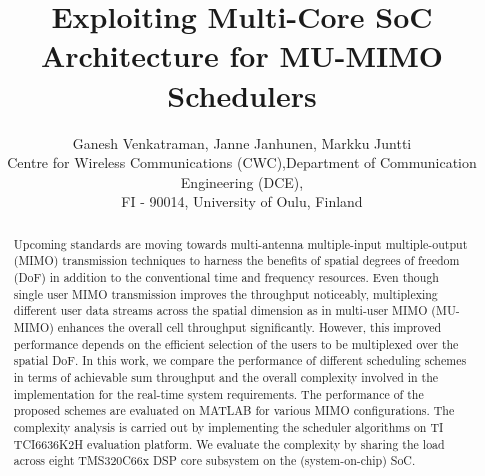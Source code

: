 \documentclass[conference,letterpaper]{./../../IEEE/IEEEtran}
\begin{document}
\title{Exploiting Multi-Core SoC Architecture for MU-MIMO Schedulers}

\author{\begin{tabular}{cc}
\multicolumn{2}{c}{Ganesh Venkatraman, Janne Janhunen, Markku Juntti}\\
Centre for Wireless Communications (CWC), & Department of Communication Engineering (DCE), \\
\multicolumn{2}{c}{FI - 90014, University of Oulu, Finland}\\
\end{tabular}}

\maketitle

\begin{abstract}
Upcoming standards are moving towards multi-antenna multiple-input multiple-output (MIMO) transmission techniques to harness the benefits of spatial degrees of freedom (DoF) in addition to the conventional time and frequency resources. Even though single user MIMO transmission improves the throughput noticeably, multiplexing different user data streams across the spatial dimension as in multi-user MIMO (MU-MIMO) enhances the overall cell throughput significantly. However, this improved performance depends on the efficient selection of the users to be multiplexed over the spatial DoF. In this work, we compare the performance of different scheduling schemes in terms of achievable sum throughput and the overall complexity involved in the implementation for the real-time system requirements. The performance of the proposed schemes are evaluated on MATLAB for various MIMO configurations. The complexity analysis is carried out by implementing the scheduler algorithms on TI TCI6636K2H evaluation platform. We evaluate the complexity by sharing the load across eight TMS320C66x DSP core subsystem on the (system-on-chip) SoC.
\end{abstract}

\acresetall
\end{document}
